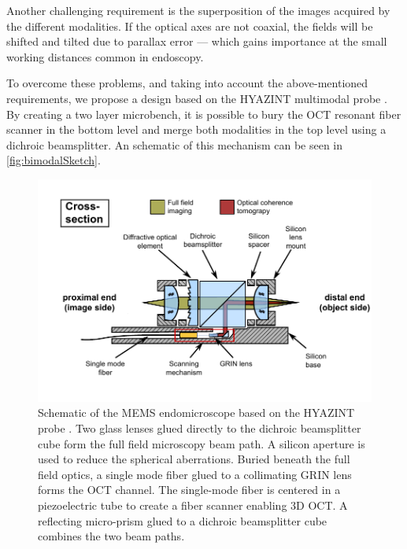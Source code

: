 Another challenging requirement is the superposition of the images acquired by the different modalities. If the optical axes are not coaxial, the fields will be shifted and tilted due to parallax error --- which gains importance at the small working distances common in endoscopy.

To overcome these problems, and taking into account the above-mentioned requirements, we propose a design based on the HYAZINT multimodal probe \cite{Blattmann2016}. By creating a two layer microbench, it is possible to bury the OCT resonant fiber scanner in the bottom level and merge both modalities in the top level using a dichroic beamsplitter. An schematic of this mechanism can be seen in \autoref{fig:bimodalSketch}.

\begin{figure}[h!]\centering
      \includegraphics{figures/30_DesignSimulation/Overview/crossSection.pdf}
      \caption{Schematic of the MEMS endomicroscope based on the HYAZINT probe \cite{Blattmann2016}. Two glass lenses glued directly to the dichroic beamsplitter cube form the full field microscopy beam path. A silicon aperture is used to reduce the spherical aberrations. Buried beneath the full field optics, a single mode fiber glued to a collimating GRIN lens forms the OCT channel. The single-mode fiber is centered in a piezoelectric tube to create a fiber scanner enabling 3D OCT. A reflecting micro-prism glued to a dichroic beamsplitter cube combines the two beam paths.}
      \label{fig:bimodalSketch}
\end{figure}

